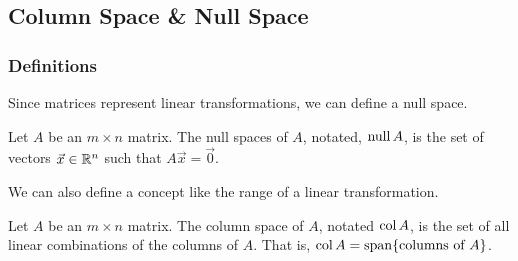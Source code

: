 \subsection{Column Space \& Null Space}

\subsubsection{Definitions}
Since matrices represent linear transformations, we can define a null space.
\begin{definition}
	Let $A$ be an $m \times n$ matrix.
	The null spaces of $A$, notated, $\operatorname{null}{A}$, is the set of vectors $\vec{x} \in \mathbb{R}^n$ such that $A\vec{x} = \vec{0}$.
\end{definition}

We can also define a concept like the range of a linear transformation.
\begin{definition}
	Let $A$ be an $m \times n$ matrix.
	The column space of $A$, notated $\operatorname{col}{A}$, is the set of all linear combinations of the columns of $A$.
	That is, $\operatorname{col}{A} = \operatorname{span}\{\text{columns of } A\}$.
\end{definition}

